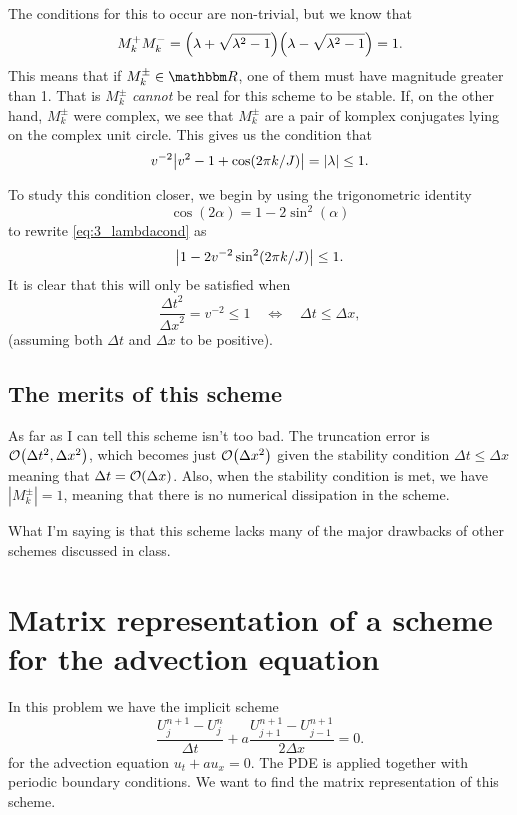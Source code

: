 \documentclass[11pt,letter, swedish, english
]{article}
\newcommand{\Dx}{\ensuremath{\Delta{x}}}
\newcommand{\Dt}{\ensuremath{\Delta{t}}}
\begin{document}
The conditions for this to occur are non-trivial, but we know that 
\begin{equation}
M_k^+M_k^-=\qty(\lambda+\sqrt{\lambda^2-1})
\qty(\lambda-\sqrt{\lambda^2-1})
=1.
\end{equation}
This means that if $M_k^\pm\in\R$, one of them must have magnitude
greater than 1. That is $M_k^\pm$ \emph{cannot} be real for this
scheme to be stable. If, on the other hand, $M_k^\pm$ were complex, we
see that $M_k^\pm$ are a pair of komplex conjugates lying on the
complex unit circle. This gives us the condition that
\begin{equation}\label{eq:3_lambdacond}
v^{-2}\abs{v^{2}-1+\cos(2\pi k/J)}=|\lambda|\le1.
\end{equation}

To study this condition closer, we begin by using the trigonometric
identity
\begin{equation}
\cos(2\alpha)=1-2\sin^2(\alpha)
\end{equation}
to rewrite \eqref{eq:3_lambdacond} as
\begin{equation}
\abs{1-2v^{-2}\sin^2(2\pi k/J)}\le1.
\end{equation}
It is clear that this will only be satisfied when
\begin{equation}
\frac{\Dt^2}{\Dx^2}=v^{-2}\le1
\quad\Longleftrightarrow\quad
\Dt\le\Dx,
\end{equation}
(assuming both $\Dt$ and $\Dx$ to be positive).

\subsection{The merits of this scheme}
As far as I can tell this scheme isn't too bad. The truncation error
is $\order{\Dt^2,\Dx^2}$, which becomes just $\order{\Dx^2}$ given the
stability condition $\Dt\le\Dx$ meaning that $\Dt=\order{\Dx}$. Also,
when the stability condition is met, we have $|M_k^\pm|=1$, meaning
that there is no numerical dissipation in the scheme. 

What I'm saying is that this scheme lacks many of the major drawbacks
of other schemes discussed in class. 




\section{Matrix representation of a scheme for the advection equation}
\newcommand{\odelta}[1]{{\mathring{\delta}^{J}_{#1}}}
In this problem we have the implicit scheme
\begin{equation}
\frac{U_j^{n+1}-U_j^n}{\Dt}
+a\frac{U_{j+1}^{n+1}-U_{j-1}^{n+1}}{2\Dx}=0.
\end{equation}
for the advection equation $u_t+au_x=0$. The PDE is applied
together with periodic boundary conditions.
We want to find the matrix representation of this scheme.
\end{document}
